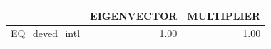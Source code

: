 \begin{tabular}{rrr}
  \hline
 & EIGENVECTOR & MULTIPLIER \\ 
  \hline
EQ\_deved\_intl & 1.00 & 1.00 \\ 
   \hline
\end{tabular}
